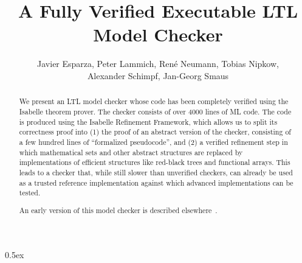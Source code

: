 \documentclass[11pt,a4paper]{article}
\begin{document}
\title{A Fully Verified Executable LTL Model Checker}
\author{Javier Esparza, Peter Lammich, Ren\'{e} Neumann, Tobias Nipkow,\\Alexander Schimpf, Jan-Georg Smaus}

\maketitle

\begin{abstract}
We present an LTL model checker whose code has been completely verified using
the Isabelle theorem prover. The checker consists of over 4000 lines of
ML code. The code is produced using the Isabelle Refinement
Framework, which allows us to split its correctness proof into (1) the proof
of an abstract version of the checker, consisting of a few hundred lines of
``formalized pseudocode'', and (2) a verified refinement step in which mathematical sets and
other abstract structures are replaced by implementations of efficient
structures like red-black trees and functional arrays. This leads to a checker that,
while still slower than unverified checkers, can already be used as a trusted
reference implementation against which advanced implementations can be
tested.

An early version of this model checker is described elsewhere~\cite{VeriLTLMC13}.
\end{abstract}

\clearpage

\tableofcontents

\clearpage

\parindent 0pt\parskip 0.5ex



\clearpage



\end{document}
